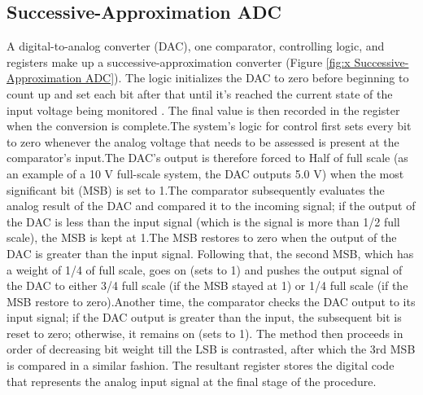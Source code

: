 \subsection{Successive-Approximation ADC}
A digital-to-analog converter (DAC), one comparator, controlling logic, and registers make up a successive-approximation converter (Figure \ref{fig:x Successive-Approximation ADC}). The logic initializes the DAC to zero before beginning to count up and set each bit after that until it's reached the current state of the input voltage being monitored \cite{DAQHandbook}. The final value is then recorded in the register when the conversion is complete.The system's logic for control first sets every bit to zero whenever the analog voltage that needs to be assessed is present at the comparator's input.The DAC's output is therefore forced to Half of full scale (as an example of a 10 V full-scale system, the DAC outputs 5.0 V) when the most significant bit (MSB) is set to 1.The comparator subsequently evaluates the analog result of the DAC and compared it to the incoming signal; if the output of the DAC is less than the input signal (which is the signal is more than 1/2 full scale), the MSB is kept at 1.The MSB restores to zero when the output of the DAC is greater than the input signal. Following that, the second MSB, which has a weight of 1/4 of full scale, goes on (sets to 1) and pushes the output signal of the DAC to either 3/4 full scale (if the MSB stayed at 1) or 1/4 full scale (if the MSB restore to zero).Another time, the comparator checks the DAC output to its input signal; if the DAC output is greater than the input, the subsequent bit is reset to zero; otherwise, it remains on (sets to 1). The method then proceeds in order of decreasing bit weight till the LSB is contrasted, after which the 3rd MSB is compared in a similar fashion. The resultant register stores the digital code that represents the analog input signal at the final stage of the procedure.

